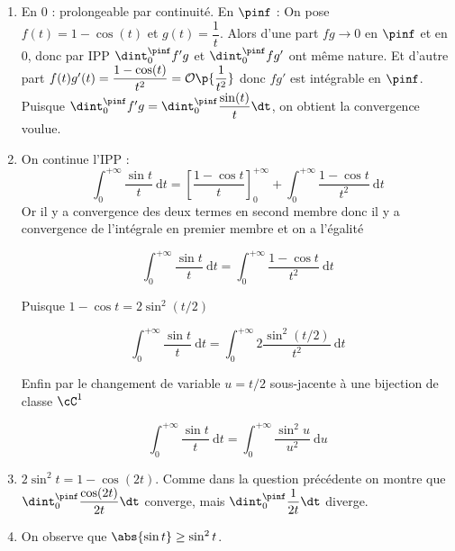 \begin{enumerate}
\item En 0 : prolongeable par continuité.
En $\pinf$ : On pose $f(t)=1-\cos(t)$ et $g(t)=\dfrac1t$. Alors d'une part $fg\rightarrow 0$ en $\pinf$ et en 0, donc par IPP $\dint_0^{\pinf} f'g$ et $\dint_0^{\pinf}  fg'$ ont même nature. Et d'autre part $f(t)g'(t)=\dfrac{1-\cos(t)}{t^2}=\mathcal O\p{\dfrac{1}{t^2}}$ donc $fg'$ est intégrable en $\pinf$.
Puisque $\dint_0^{\pinf} f'g=\dint_0^{\pinf} \dfrac{\sin(t)}{t}\dt$, on obtient la convergence voulue.
\item On continue l'IPP :\\
$$\int_0^{+\infty} \frac{\sin t}{t} \mathrm{~d} t=\left[\frac{1-\cos t}{t}\right]_0^{+\infty}+\int_0^{+\infty} \frac{1-\cos t}{t^2} \mathrm{~d} t$$
Or il y a convergence des deux termes en second membre donc il y a convergence de l'intégrale en premier membre et on a l'égalité

$$
\int_0^{+\infty} \frac{\sin t}{t} \mathrm{~d} t=\int_0^{+\infty} \frac{1-\cos t}{t^2} \mathrm{~d} t
$$


Puisque $1-\cos t=2 \sin ^2(t / 2)$

$$
\int_0^{+\infty} \frac{\sin t}{t} \mathrm{~d} t=\int_0^{+\infty} 2 \frac{\sin ^2(t / 2)}{t^2} \mathrm{~d} t
$$


Enfin par le changement de variable $u=t / 2$ sous-jacente à une bijection de classe $\cC^1$

$$
\int_0^{+\infty} \frac{\sin t}{t} \mathrm{~d} t=\int_0^{+\infty} \frac{\sin ^2 u}{u^2} \mathrm{~d} u
$$

\item $2\sin^2t=1-\cos(2t)$. Comme dans la question précédente on montre que $\dint_0^{\pinf}\dfrac{\cos(2t)}{2t}\dt$ converge, mais $\dint_0^{\pinf}\dfrac{1}{2t}\dt$ diverge.
\item On observe que $\abs{\sin t}\geq \sin^2 t$.
\end{enumerate}
